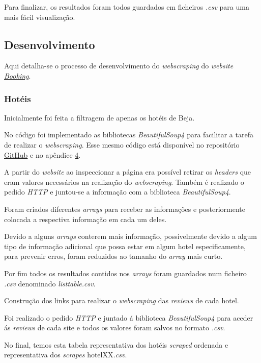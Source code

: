 Para finalizar, os resultados foram todos guardados em ficheiros \textit{.csv} para uma mais fácil visualização.

\subsection{Desenvolvimento}

Aqui detalha-se o processo de desenvolvimento do \textit{webscraping} do \textit{website} \href{https://www.booking.com/country/pt.pt-pt.html}{\textit{Booking}}.

\subsubsection{Hotéis}

Inicialmente foi feita a filtragem de apenas os hotéis de Beja.

No código foi implementado as bibliotecas \textit{BeautifulSoup4} para facilitar a tarefa de realizar o \textit{webscraping}. Esse mesmo código está disponível no repositório \href{https://github.com/CatKinKitKat/pi2021/tree/master/projecto/webscrape/scrapes}{GitHub} e no apêndice \hyperref[ap4]{4}.

A partir do \textit{website} ao inspeccionar a página era possível retirar os \textit{headers} que eram valores necessários na realização do \textit{webscraping}.
Também é realizado o pedido \textit{HTTP} e juntou-se a informação com a biblioteca \textit{BeautifulSoup4}.

Foram criados diferentes \textit{arrays} para receber as informações e posteriormente colocada a respectiva informação em cada um deles.

Devido a alguns \textit{arrays} conterem mais informação, possivelmente devido a algum tipo de informação adicional que possa estar em algum hotel especificamente, para prevenir erros, foram reduzidos ao tamanho do \textit{array} mais curto.

Por fim todos os resultados contidos nos \textit{arrays} foram guardados num ficheiro \textit{.csv} denominado \textit{listtable.csv}.

Construção dos links para realizar o \textit{webscraping} das \textit{reviews} de cada hotel.

Foi realizado o pedido \textit{HTTP} e juntado á biblioteca \textit{BeautifulSoup4} para aceder ás \textit{reviews} de cada site e todos os valores foram salvos no formato \textit{.csv}.

No final, temos esta tabela representativa dos hotéis \textit{scraped} ordenada e representativa dos \textit{scrapes} hotelXX\textit{.csv}.

